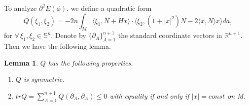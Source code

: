\documentclass[11pt,reqno]{amsart}
\newtheorem{lem}[thm]{Lemma}
\theoremstyle{definition}
\begin{document}
To analyze ${\partial}^2 E(\phi)$, we define a quadratic form
\begin{equation}
Q(\xi_1,\xi_2)=-2n\int_M \langle \xi_1,N+Hx\rangle\cdot \langle \xi_2, (1+|x|^2)N-2\langle x,N\rangle x \rangle da,
\end{equation}
for $\forall\, \xi_1,\xi_2\in {\mathbb S}^n$. Denote by $\{{\partial}_A\}_{A=1}^{n+1}$ the standard coordinate vectors in ${\mathbb R}^{n+1}$. Then we have the following lemma.
\begin{lem}\label{lem2}
$Q$ has the following properties.
\begin{enumerate}
  \item $Q$ is symmetric.
  \item $tr Q=\sum\limits_{A=1}^{n+1} Q({\partial}_A,{\partial}_A)\leq 0$ with equality if and only if $|x|=const$ on M.
\end{enumerate}
\end{lem}
\end{document}
